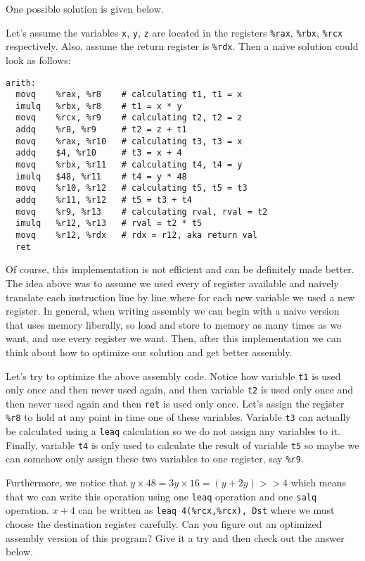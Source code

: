 \documentclass [10pt]{article}
\begin{document}
One possible solution is given below.

Let's assume the variables \verb|x|, \verb|y|, \verb|z| are located in the registers \verb|%rax|, \verb|%rbx|, \verb|%rcx| respectively. Also, assume the return register is \verb|%rdx|. Then a naive solution could look as follows:

\begin{verbatim}
arith:
  movq    %rax, %r8    # calculating t1, t1 = x
  imulq   %rbx, %r8    # t1 = x * y
  movq    %rcx, %r9    # calculating t2, t2 = z
  addq    %r8, %r9     # t2 = z + t1
  movq    %rax, %r10   # calculating t3, t3 = x
  addq    $4, %r10     # t3 = x + 4
  movq    %rbx, %r11   # calculating t4, t4 = y
  imulq   $48, %r11    # t4 = y * 48
  movq    %r10, %r12   # calculating t5, t5 = t3
  addq    %r11, %r12   # t5 = t3 + t4
  movq    %r9, %r13    # calculating rval, rval = t2
  imulq   %r12, %r13   # rval = t2 * t5
  movq    %r12, %rdx   # rdx = r12, aka return val
  ret
\end{verbatim}

Of course, this implementation is not efficient and can be definitely made better. The idea above was to assume we used every of register available and naively translate each instruction line by line where for each new variable we used a new register. In general, when writing assembly we can begin with a naive version that uses memory liberally, so load and store to memory as many times as we want, and use every register we want. Then, after this implementation we can think about how to optimize our solution and get better assembly.\par
Let's try to optimize the above assembly code. Notice how variable \verb|t1| is used only once and then never used again, and then variable \verb|t2| is used only once and then never used again and then \verb|ret| is used only once. Let's assign the register \verb|%r8| to hold at any point in time one of these variables. Variable \verb|t3| can actually be calculated using a \verb|leaq| calculation so we do not assign any variables to it. Finally, variable \verb|t4| is only used to calculate the result of variable \verb|t5| so maybe we can somehow only assign these two variables to one register, say \verb|%r9|.\par

Furthermore, we notice that $y\times48=3y\times16=(y+2y)>>4$ which means that we can write this operation using one \verb|leaq| operation and one \verb|salq| operation. $x+4$ can be written as \verb|leaq 4(%rcx,%rcx), Dst| where we must choose the destination register carefully. Can you figure out an optimized assembly version of this program? Give it a try and then check out the answer below.
\end{document}
